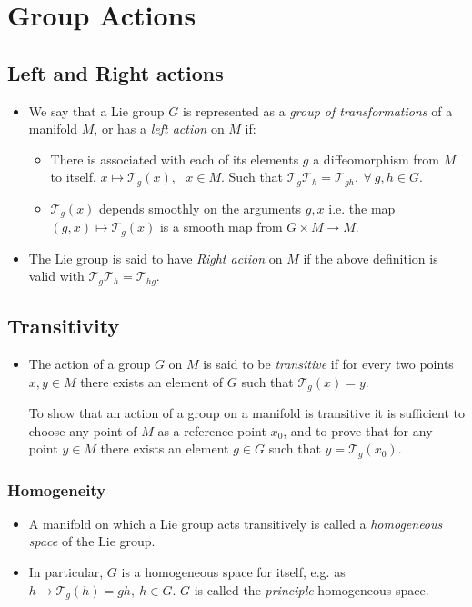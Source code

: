 \documentclass[11pt]{article}
\numberwithin{equation}{section}
\begin{document}
\newpage 
\section{Group Actions}
\subsection{Left and Right actions} %
\label{sub:left_and_right_actions}
\begin{itemize}
  \item We say that a Lie group $G$ is represented as a \emph{group of transformations} of a manifold $M$, or has a \emph{left action} on $M$ if:
  \begin{itemize}
    \item There is associated with each of its elements $g$ a diffeomorphism from $M$ to itself. $x \mapsto \mathcal{T}_{g}(x),~~~x \in M$. Such that $\mathcal{T}_{g}\mathcal{T}_{h} = \mathcal{T}_{gh},~\forall~g,h \in G$. 
    \item $\mathcal{T}_{g}(x)$ depends smoothly on the arguments $g,x$ i.e. the map $(g,x) \mapsto \mathcal{T}_{g}(x)$ is a smooth map from $G \times M \rightarrow M$. 
  \end{itemize}

  \item The Lie group is said to have \emph{Right action} on $M$ if the above definition is valid with $\mathcal{T}_{g}\mathcal{T}_{h} = \mathcal{T}_{hg}$.  
\end{itemize}



\subsection{Transitivity} %
\label{sub:transitivity}
\begin{itemize}
  \item The action of a group $G$ on $M$ is said to be \emph{transitive} if for every two points $x,y \in M$ there exists an element of $G$ such that $\mathcal{T}_{g}(x) =y$. 

  To show that an action of a group on a manifold is transitive it is sufficient to choose any point of $M$ as a reference point $x_0$, and to prove that for any point $y\in M$ there exists an element $g \in G$ such that $y = \mathcal{T}_{g}(x_0)$. 
\end{itemize}

\subsubsection{Homogeneity} %
\label{ssub:Homogeneity}
\begin{itemize}
  \item A manifold on which a Lie group acts transitively is called a \emph{homogeneous space} of the Lie group. 

  \item In particular, $G$ is a homogeneous space for itself, e.g. as $h \rightarrow \mathcal{T}_{g}(h)=gh,~h \in G$. $G$ is called the \emph{principle} homogeneous space. 
\end{itemize}
\end{document}
